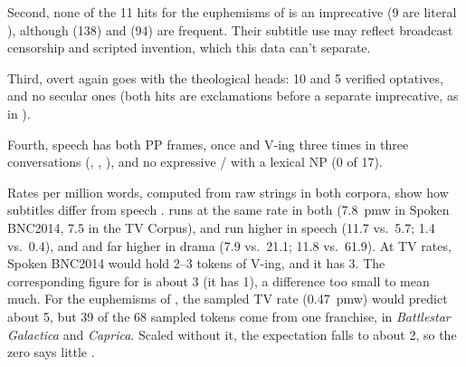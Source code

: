 \documentclass[12pt]{article}
\begin{document}
Second, none of the 11 hits for the euphemisms of  is an imprecative (9 are literal ), although  (138) and  (94) are frequent. Their subtitle use may reflect broadcast censorship and scripted invention, which this data can't separate.

Third, overt  again goes with the theological heads: 10  and 5 verified  optatives, and no secular ones (both  hits are exclamations before a separate imprecative, as in ).

Fourth, speech has both PP frames,  once and  V-ing three times in three conversations (, , ), and no expressive / with a lexical NP (0 of 17).

Rates per million words, computed from raw strings in both corpora, show how subtitles differ from speech \citep{kilgarriff2001}.  runs at the same rate in both (7.8~pmw in Spoken BNC2014, 7.5 in the TV Corpus),  and  run higher in speech (11.7 vs.\ 5.7; 1.4 vs.\ 0.4), and  and  far higher in drama (7.9 vs.\ 21.1; 11.8 vs.\ 61.9). At TV rates, Spoken BNC2014 would hold 2--3 tokens of  V-ing, and it has 3. The corresponding figure for  is about 3 (it has 1), a difference too small to mean much. For the euphemisms of , the sampled TV rate (0.47~pmw) would predict about 5, but 39 of the 68 sampled tokens come from one franchise,  in \emph{Battlestar Galactica} and \emph{Caprica}. Scaled without it, the expectation falls to about 2, so the zero says little \citep{kilgarriff2005}.

\clearpage
\printbibliography
\end{document}

